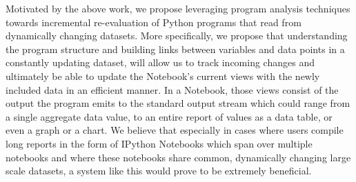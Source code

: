 \documentclass[11pt,letterpaper]{article}
\begin{document}
Motivated by the above work, we propose leveraging program analysis techniques towards incremental re-evaluation of Python programs that read from dynamically changing datasets. More specifically, we propose that understanding the program structure and building links between variables and data points in a constantly updating dataset, will allow us to track incoming changes and ultimately be able to update the Notebook's current views with the newly included data in an efficient manner. In a Notebook, those views consist of the output the program emits to the standard output stream which could range from a single aggregate data value, to an entire report of values as a data table, or even a graph or a chart. We believe that especially in cases where users compile long reports in the form of IPython Notebooks which span over multiple notebooks and where these notebooks share common, dynamically changing large scale datasets, a system like this would prove to be extremely beneficial.



\end{document}
